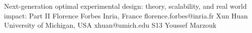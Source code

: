 

\clearpage

\begin{session}
 {Next-generation optimal experimental design: theory, scalability, and real world impact: Part II}%
 {Florence Forbes}%
 {Inria, France}%
 {florence.forbes@inria.fr}%
 {Xun Huan}%
 {University of Michigan, USA}%
 {xhuan@umich.edu}%
 {S13}%
 {Youssef Marzouk}%


\end{session}
